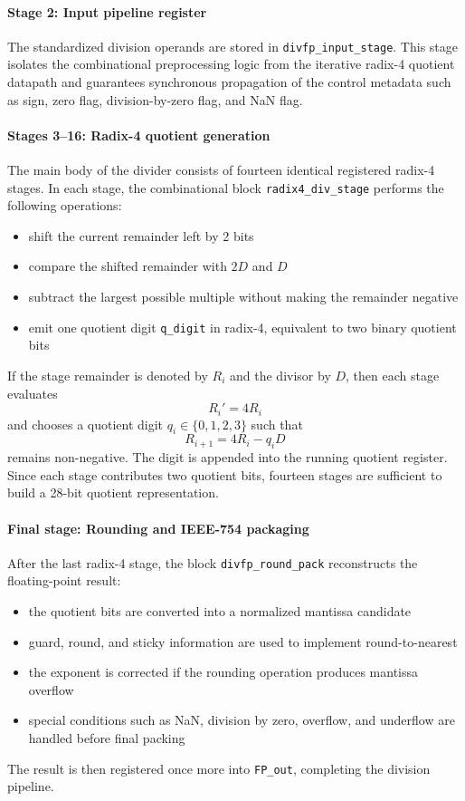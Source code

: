 \paragraph{Stage 2: Input pipeline register}
The standardized division operands are stored in \texttt{divfp\_input\_stage}. This stage isolates the combinational preprocessing logic from the iterative radix-4 quotient datapath and guarantees synchronous propagation of the control metadata such as sign, zero flag, division-by-zero flag, and NaN flag.

\paragraph{Stages 3--16: Radix-4 quotient generation}
The main body of the divider consists of fourteen identical registered radix-4 stages. In each stage, the combinational block \texttt{radix4\_div\_stage} performs the following operations:
\begin{itemize}
    \item shift the current remainder left by 2 bits
    \item compare the shifted remainder with $2D$ and $D$
    \item subtract the largest possible multiple without making the remainder negative
    \item emit one quotient digit \texttt{q\_digit} in radix-4, equivalent to two binary quotient bits
\end{itemize}

If the stage remainder is denoted by $R_i$ and the divisor by $D$, then each stage evaluates
\begin{equation}
R_i' = 4R_i
\end{equation}
and chooses a quotient digit $q_i \in \{0,1,2,3\}$ such that
\begin{equation}
R_{i+1} = 4R_i - q_iD
\end{equation}
remains non-negative. The digit is appended into the running quotient register. Since each stage contributes two quotient bits, fourteen stages are sufficient to build a 28-bit quotient representation.

\paragraph{Final stage: Rounding and IEEE-754 packaging}
After the last radix-4 stage, the block \texttt{divfp\_round\_pack} reconstructs the floating-point result:
\begin{itemize}
    \item the quotient bits are converted into a normalized mantissa candidate
    \item guard, round, and sticky information are used to implement round-to-nearest
    \item the exponent is corrected if the rounding operation produces mantissa overflow
    \item special conditions such as NaN, division by zero, overflow, and underflow are handled before final packing
\end{itemize}
The result is then registered once more into \texttt{FP\_out}, completing the division pipeline.

